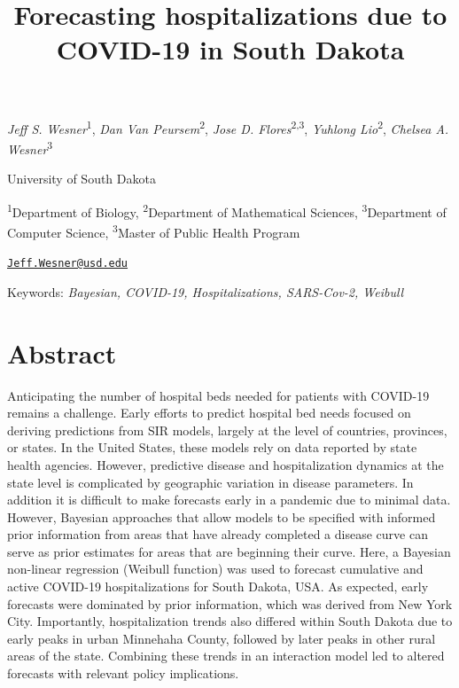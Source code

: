 \documentclass[
]{article}
\title{Forecasting hospitalizations due to COVID-19 in South Dakota}
\author{}
\date{\vspace{-2.5em}}
\begin{document}
\maketitle

\emph{Jeff S. Wesner}\textsuperscript{1}, \emph{Dan Van Peursem}\textsuperscript{2}, \emph{Jose D. Flores}\textsuperscript{2,3}, \emph{Yuhlong Lio}\textsuperscript{2}, \emph{Chelsea A. Wesner}\textsuperscript{3}

University of South Dakota

\textsuperscript{1}Department of Biology, \textsuperscript{2}Department of Mathematical Sciences, \textsuperscript{3}Department of Computer Science, \textsuperscript{3}Master of Public Health Program

\href{mailto:Jeff.Wesner@usd.edu}{\nolinkurl{Jeff.Wesner@usd.edu}}

Keywords: \emph{Bayesian, COVID-19, Hospitalizations, SARS-Cov-2, Weibull }

\hypertarget{abstract}{%
\section{Abstract}\label{abstract}}

Anticipating the number of hospital beds needed for patients with COVID-19 remains a challenge. Early efforts to predict hospital bed needs focused on deriving predictions from SIR models, largely at the level of countries, provinces, or states. In the United States, these models rely on data reported by state health agencies. However, predictive disease and hospitalization dynamics at the state level is complicated by geographic variation in disease parameters. In addition it is difficult to make forecasts early in a pandemic due to minimal data. However, Bayesian approaches that allow models to be specified with informed prior information from areas that have already completed a disease curve can serve as prior estimates for areas that are beginning their curve. Here, a Bayesian non-linear regression (Weibull function) was used to forecast cumulative and active COVID-19 hospitalizations for South Dakota, USA. As expected, early forecasts were dominated by prior information, which was derived from New York City. Importantly, hospitalization trends also differed within South Dakota due to early peaks in urban Minnehaha County, followed by later peaks in other rural areas of the state. Combining these trends in an interaction model led to altered forecasts with relevant policy implications.
\end{document}
